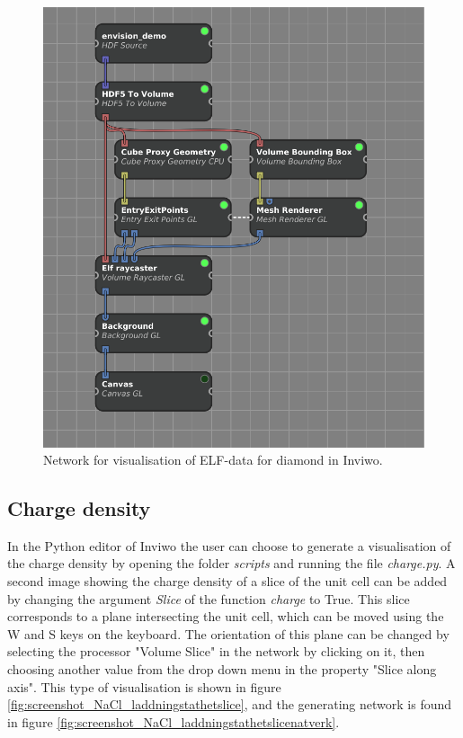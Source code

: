 \documentclass[a4paper,12pt]{article}
\begin{document}
\begin{figure} [H]
\centering
\includegraphics[scale=0.4]{screenshot_elfnatverk_diamant.png}
\caption{Network for visualisation of ELF-data for diamond in Inviwo.}
\label{fig:screenshot_elf_network}
\end{figure}

\subsection{Charge density}
\label{ch:charge}
In the Python editor of Inviwo the user can choose to generate a visualisation of the charge density by opening the folder \textit{scripts} and running the file \textit{charge.py}. A second image showing the charge density of a slice of the unit cell can be added by changing the argument \textit{Slice} of the function \textit{charge} to True. This slice corresponds to a plane intersecting the unit cell, which can be moved using the W and S keys on the keyboard. The orientation of this plane can be changed by selecting the processor "Volume Slice" in the network by clicking on it, then choosing another value from the drop down menu in the property "Slice along axis". This type of visualisation is shown in figure \ref{fig:screenshot_NaCl_laddningstathetslice}, and the generating network is found in figure \ref{fig:screenshot_NaCl_laddningstathetslicenatverk}.
\end{document}
